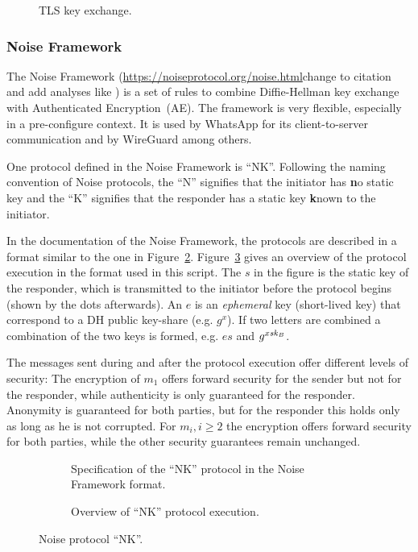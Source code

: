 \begin{figure}[!ht]
    \centering
    
    \caption{TLS key exchange.}
    \label{fig:ake:tls}
\end{figure}

\subsubsection{Noise Framework}
The Noise Framework (\url{https://noiseprotocol.org/noise.html}change to citation and add analyses like \cite{PKC:DowRosSch20,CCS:ADHSW22}) is a set of rules to combine Diffie-Hellman key exchange with Authenticated Encryption~(AE).
The framework is very flexible, especially in a pre-configure context.
It is used by WhatsApp for its client-to-server communication and by WireGuard among others.

One protocol defined in the Noise Framework is ``NK''. 
Following the naming convention of Noise protocols, the ``N'' signifies that the initiator has \textbf{n}o static key and the ``K'' signifies that the responder has a static key \textbf{k}nown to the initiator.

In the documentation of the Noise Framework, the protocols are described in a format similar to the one in Figure~\ref{fig:ake:noise:nk}.
Figure~\ref{fig:ake:noise:nk_overview} gives an overview of the protocol execution in the format used in this script.
The $s$ in the figure is the static key of the responder, which is transmitted to the initiator before the protocol begins (shown by the dots afterwards).
An $e$ is an \emph{ephemeral} key (short-lived key) that correspond to a DH public key-share (e.g. $g^x$).
If two letters are combined a combination of the two keys is formed, e.g. $es$ and $g^{x\mathit{sk}_B}$.

The messages sent during and after the protocol execution offer different levels of security: 
The encryption of $m_1$ offers forward security for the sender but not for the responder, while authenticity is only guaranteed for the responder.
Anonymity is guaranteed for both parties, but for the responder this holds only as long as he is not corrupted.
For $m_i, i\geq 2$ the encryption offers forward security for both parties, while the other security guarantees remain unchanged.

\begin{figure}[!ht]
    \centering
    \begin{subfigure}{.33\textwidth}
        \centering
        
        \caption{Specification of the ``NK'' protocol in the Noise Framework format.}
        \label{fig:ake:noise:nk}
    \end{subfigure}\hfill
    \begin{subfigure}{.66\textwidth}
        \centering
        
        \caption{Overview of ``NK'' protocol execution.}
        \label{fig:ake:noise:nk_overview}
    \end{subfigure}
    \caption{Noise protocol ``NK''.}
    \label{fig:ake:noise}
\end{figure}

